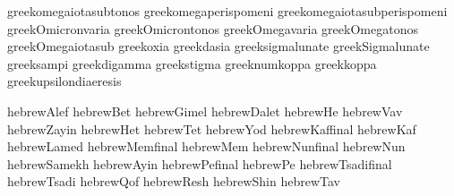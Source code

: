  greekomegaiotasubtonos              {}
 greekomegaperispomeni               {}
 greekomegaiotasubperispomeni        {}
 greekOmicronvaria                   {}
 greekOmicrontonos                   {}
 greekOmegavaria                     {}
 greekOmegatonos                     {}
 greekOmegaiotasub                   {}
 greekoxia                           {}
 greekdasia                          {}
 greeksigmalunate                    {}
 greekSigmalunate                    {}
 greeksampi                          {}
 greekdigamma                        {}
 greekstigma                         {}
 greeknumkoppa                       {}
 greekkoppa                          {}
 greekupsilondiaeresis               {}

\stopencoding


\startencoding[uc]

 hebrewAlef          {} %
 hebrewBet           {}
 hebrewGimel         {}
 hebrewDalet         {}
 hebrewHe            {}
 hebrewVav           {}
 hebrewZayin         {}
 hebrewHet           {}
 hebrewTet           {}
 hebrewYod           {}
 hebrewKaffinal      {}
 hebrewKaf           {}
 hebrewLamed         {}
 hebrewMemfinal      {}
 hebrewMem           {}
 hebrewNunfinal      {}
 hebrewNun           {}
 hebrewSamekh        {}
 hebrewAyin          {}
 hebrewPefinal       {}
 hebrewPe            {}
 hebrewTsadifinal    {}
 hebrewTsadi         {}
 hebrewQof           {}
 hebrewResh          {}
 hebrewShin          {}
 hebrewTav           {} %

\stopencoding

\endinput
